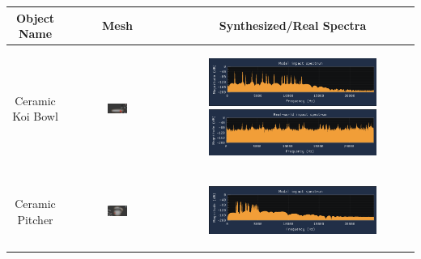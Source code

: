 \documentclass[12pt]{article}
\begin{document}
\begin{table}[!ht]
  \centering
  \caption{Comparison of Mesh, Modal Spectrum, and Real Spectrum for Various Objects}
  \label{tab:SpectrumComparison}
  \begin{tabular}{|c|c|c|}
  \hline
  \textbf{Object Name} & \textbf{Mesh} & \textbf{Synthesized/Real Spectra} \\ \hline
  Ceramic Koi Bowl & \includegraphics[width=0.2\textwidth]{images/impacts/CeramicKoiBowlMesh.png} & 
  \begin{subfigure}{0.3\linewidth}
    \includegraphics[width=\linewidth]{images/impacts/CeramicKoiBowlModal.png}
    \includegraphics[width=\linewidth]{images/impacts/CeramicKoiBowlReal.png}
  \end{subfigure} \\ \hline
  Ceramic Pitcher & \includegraphics[width=0.2\textwidth]{images/impacts/CeramicPitcherMesh.png} & 
  \begin{subfigure}{0.3\linewidth}
    \includegraphics[width=\linewidth]{images/impacts/CeramicPitcherModal.png}

\end{subfigure}
\end{tabular}
\end{table}
\end{document}

